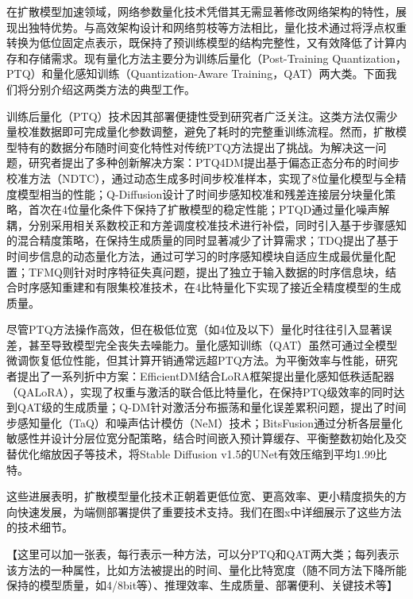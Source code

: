 \documentclass[11pt,a4paper,UTF8]{ctexart}
\begin{document}
在扩散模型加速领域，网络参数量化技术凭借其无需显著修改网络架构的特性，展现出独特优势。与高效架构设计和网络剪枝等方法相比，量化技术通过将浮点权重转换为低位固定点表示\cite{gholami2022survey,jin2022fnet}，既保持了预训练模型的结构完整性，又有效降低了计算内存和存储需求。现有量化方法主要分为训练后量化（Post-Training Quantization，PTQ）和量化感知训练（Quantization-Aware Training，QAT）两大类。下面我们将分别介绍这两类方法的典型工作。

训练后量化（PTQ）技术因其部署便捷性受到研究者广泛关注。这类方法仅需少量校准数据即可完成量化参数调整，避免了耗时的完整重训练流程。然而，扩散模型特有的数据分布随时间变化特性对传统PTQ方法提出了挑战。为解决这一问题，研究者提出了多种创新解决方案：PTQ4DM\cite{shang2023post}提出基于偏态正态分布的时间步校准方法（NDTC），通过动态生成多时间步校准样本，实现了8位量化模型与全精度模型相当的性能；Q-Diffusion\cite{li2023q}设计了时间步感知校准和残差连接层分块量化策略，首次在4位量化条件下保持了扩散模型的稳定性能；PTQD\cite{he2023ptqd}通过量化噪声解耦，分别采用相关系数校正和方差调度校准技术进行补偿，同时引入基于步骤感知的混合精度策略，在保持生成质量的同时显著减少了计算需求；TDQ\cite{so2023temporal}提出了基于时间步信息的动态量化方法，通过可学习的时序感知模块自适应生成最优量化配置；TFMQ\cite{Huang_2024_CVPR}则针对时序特征失真问题，提出了独立于输入数据的时序信息块，结合时序感知重建和有限集校准技术，在4比特量化下实现了接近全精度模型的生成质量。

尽管PTQ方法操作高效，但在极低位宽（如4位及以下）量化时往往引入显著误差，甚至导致模型完全丧失去噪能力\cite{he2023ptqd}。量化感知训练（QAT）\cite{krishnamoorthi2018quantizing,esser2019learned}虽然可通过全模型微调恢复低位性能，但其计算开销通常远超PTQ方法。为平衡效率与性能，研究者提出了一系列折中方案：EfficientDM\cite{he2024efficientdm}结合LoRA框架\cite{hu2022lora}提出量化感知低秩适配器（QALoRA），实现了权重与激活的联合低比特量化，在保持PTQ级效率的同时达到QAT级的生成质量；Q-DM\cite{li2023qdm}针对激活分布振荡和量化误差累积问题，提出了时间步感知量化（TaQ）和噪声估计模仿（NeM）技术；BitsFusion\cite{sui2024bitsfusion}通过分析各层量化敏感性并设计分层位宽分配策略，结合时间嵌入预计算缓存、平衡整数初始化及交替优化缩放因子等技术，将Stable Diffusion v1.5的UNet有效压缩到平均1.99比特。

这些进展表明，扩散模型量化技术正朝着更低位宽、更高效率、更小精度损失的方向快速发展，为端侧部署提供了重要技术支持。我们在图x中详细展示了这些方法的技术细节。

【这里可以加一张表，每行表示一种方法，可以分PTQ和QAT两大类；每列表示该方法的一种属性，比如方法被提出的时间、量化比特宽度（随不同方法下降所能保持的模型质量，如4/8bit等）、推理效率、生成质量、部署便利、关键技术等】
\end{document}
